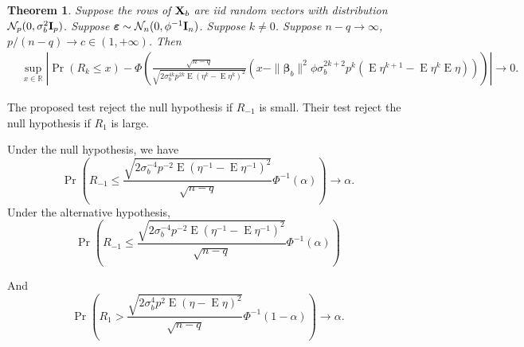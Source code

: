 \documentclass[11pt]{article}
\DeclareMathOperator{\myE}{E}
\newcommand{\bfsym}[1]{\ensuremath{\boldsymbol{#1}}}
\def\bbeta{\bfsym \beta}
\theoremstyle{plain}
\newtheorem{theorem}{\quad\quad Theorem}
\theoremstyle{definition}
\theoremstyle{remark}
\begin{document}
\begin{theorem}\label{generalTheorem}
    Suppose the rows of $\mathbf{X}_b$ are iid random vectors with distribution $\mathcal N_p(0,\sigma_b^2\mathbf{I}_p)$.
    Suppose $\bepsilon\sim \mathcal N_n (0,\phi^{-1} \BI_n)$.
    Suppose $k\neq 0$.
    Suppose $n-q\to \infty$, $p/(n-q)\to c \in (1,+\infty)$.
    Then
\begin{equation*}
    \begin{split}
        &
        \sup_{x\in\mathbb R}\left|
        \Pr\left( 
            R_k
        \leq
        x
        \right) 
        -
        \Phi\left( 
    \frac{
        \sqrt{n-q}
    }{\sqrt{
            2
            \sigma_b^{4k} p^{2k}
            \myE (\eta^k - \myE \eta^k)^2
    }}
    \left( 
    x
    -
          \|\bbeta_b\|^2 \phi \sigma_b^{2k+2} p^k  \left(\myE \eta^{k+1} - \myE \eta^k \myE \eta\right)
    \right)
        \right)
        \right|
        \to 0
        .
    \end{split}
\end{equation*}
\end{theorem}
The proposed test reject the null hypothesis if $R_{-1}$ is small.
Their test reject the null hypothesis if $R_{1}$ is large.

Under the null hypothesis, we have
\begin{equation*}
    \Pr\left( 
        R_{-1} \leq  
    \frac{\sqrt{
            2
            \sigma_b^{-4} p^{-2}
            \myE (\eta^{-1} - \myE \eta^{-1})^2
    }}{
        \sqrt{n-q}
    }
    \Phi^{-1}(\alpha)
    \right) 
    \to \alpha.
\end{equation*}
Under the alternative hypothesis,
\begin{equation*}
    \Pr\left( 
        R_{-1} \leq  
    \frac{\sqrt{
            2
            \sigma_b^{-4} p^{-2}
            \myE (\eta^{-1} - \myE \eta^{-1})^2
    }}{
        \sqrt{n-q}
    }
    \Phi^{-1}(\alpha)
    \right) 
\end{equation*}

And
\begin{equation*}
    \Pr\left( 
        R_{1} >  
    \frac{\sqrt{
            2
            \sigma_b^{4} p^{2}
            \myE (\eta - \myE \eta)^2
    }}{
        \sqrt{n-q}
    }
    \Phi^{-1}(1-\alpha)
    \right) 
    \to \alpha.
\end{equation*}
\end{document}
